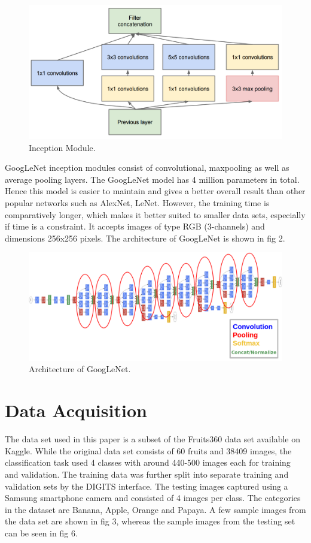 \documentclass[10pt,journal,compsoc]{IEEEtran}
\begin{document}
\begin{figure}[thpb]
      \centering
      \includegraphics[width=\linewidth]{inc.png}
      \caption{Inception Module.}
      \label{fig:robot1}
\end{figure}

GoogLeNet inception modules consist of convolutional, maxpooling as well as average pooling layers. The GoogLeNet model has 4 million parameters in total. Hence this model is easier to maintain and gives a better overall result than other popular networks such as AlexNet, LeNet. However, the training time is comparatively longer, which makes it better suited to smaller data sets, especially if time is a constraint. It accepts images of type RGB (3-channels) and dimensions 256x256 pixels. The architecture of GoogLeNet is shown in fig 2.

\begin{figure}[thpb]
      \centering
      \includegraphics[width=\linewidth]{goog.png}
      \caption{Architecture of GoogLeNet.}
      \label{fig:robot1}
\end{figure}


\section{Data Acquisition}
The data set used in this paper is a subset of the Fruits360 data set available on Kaggle. While the original data set consists of 60 fruits and 38409 images, the classification task used 4 classes with around 440-500 images each for training and validation. The training data was further split into separate training and validation sets by the DIGITS interface.
The testing images captured using a Samsung smartphone camera and consisted of 4 images per class. The categories in  the dataset are Banana, Apple, Orange and Papaya. A few sample images from the data set are shown in fig 3, whereas the sample images from the testing set can be seen in fig 6.
\end{document}
